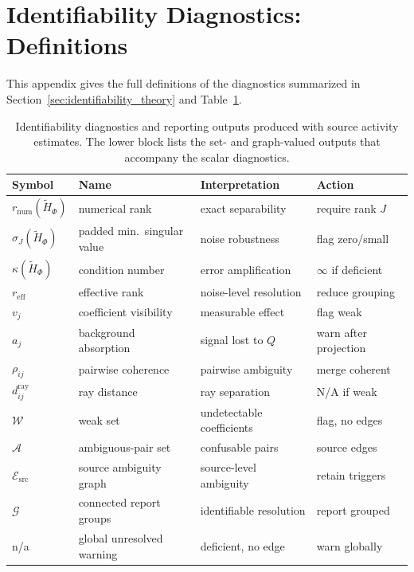 \section{Identifiability Diagnostics: Definitions}
\label{app:diagnostics_definitions}

This appendix gives the full definitions of the diagnostics summarized in
Section~\ref{sec:identifiability_theory} and Table~\ref{tab:diagnostics}.

\begin{table}[t]
\centering
\small
\setlength{\tabcolsep}{3pt}
\caption{Identifiability diagnostics and reporting outputs produced with source
activity estimates.  The lower block lists the set- and graph-valued outputs that
accompany the scalar diagnostics.}
\label{tab:diagnostics}
\begin{tabularx}{\columnwidth}{l
  >{\raggedright\arraybackslash}X
  >{\raggedright\arraybackslash}X
  >{\raggedright\arraybackslash}X}
\toprule
Symbol & Name & Interpretation & Action \\
\midrule
\(r_{\mathrm{num}}(\widetilde H_\Phi)\) & numerical rank & exact separability & require rank \(J\) \\
\(\sigma_J(\widetilde H_\Phi)\) & padded min.\ singular value & noise robustness & flag zero/small \\
\(\kappa(\widetilde H_\Phi)\) & condition number & error amplification & \(\infty\) if deficient \\
\(r_{\mathrm{eff}}\) & effective rank & noise-level resolution & reduce grouping \\
\(v_j\) & coefficient visibility & measurable effect & flag weak \\
\(a_j\) & background absorption & signal lost to \(Q\) & warn after projection \\
\(\rho_{ij}\) & pairwise coherence & pairwise ambiguity & merge coherent \\
\(d^{\mathrm{ray}}_{ij}\) & ray distance & ray separation & N/A if weak \\
\midrule
\(\mathcal W\) & weak set & undetectable coefficients & flag, no edges \\
\(\mathcal A\) & ambiguous-pair set & confusable pairs & source edges \\
\(\mathcal E_{\mathrm{src}}\) & source ambiguity graph & source-level ambiguity & retain triggers \\
\(\mathcal G\) & connected report groups & identifiable resolution & report grouped \\
n/a & global unresolved warning & deficient, no edge & warn globally \\
\bottomrule
\end{tabularx}
\end{table}

